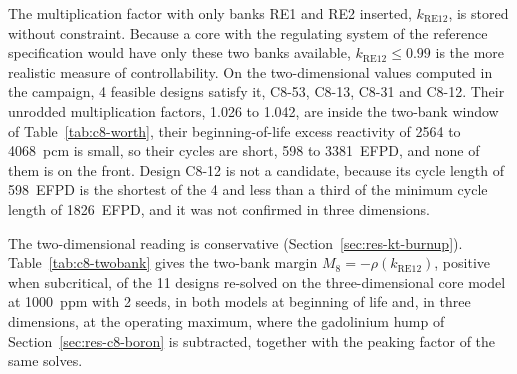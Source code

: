 The multiplication factor with only banks RE1 and RE2 inserted,
$k_\mathrm{RE12}$, is stored without constraint. Because a core with
the regulating system of the reference specification would have only
these two banks available, $k_\mathrm{RE12} \le 0.99$ is the more
realistic measure of controllability. On the two-dimensional values computed in the campaign, 4 feasible designs satisfy it, C8-53, C8-13, C8-31 and
C8-12. Their unrodded multiplication factors, 1.026 to 1.042, are inside the
two-bank window of Table~\ref{tab:c8-worth}, their beginning-of-life
excess reactivity of \num{2564} to \SI{4068}{pcm} is small, so their
cycles are short, 598 to \SI{3381}{EFPD}, and none of them is on the
front. Design C8-12 is not a candidate, because its cycle length of
\SI{598}{EFPD} is the shortest of the 4 and less than a third of the
minimum cycle length of \SI{1826}{EFPD}, and it was not confirmed in three dimensions.

The two-dimensional reading is conservative
(Section~\ref{sec:res-kt-burnup}).
Table~\ref{tab:c8-twobank} gives the two-bank margin
$M_8 = -\rho(k_\mathrm{RE12})$, positive when subcritical, of the 11
designs re-solved on the three-dimensional core model at
\SI{1000}{ppm} with 2 seeds, in both models at beginning of life and, in three dimensions, at
the operating maximum, where the gadolinium hump of
Section~\ref{sec:res-c8-boron} is subtracted, together with the peaking
factor of the same solves.

